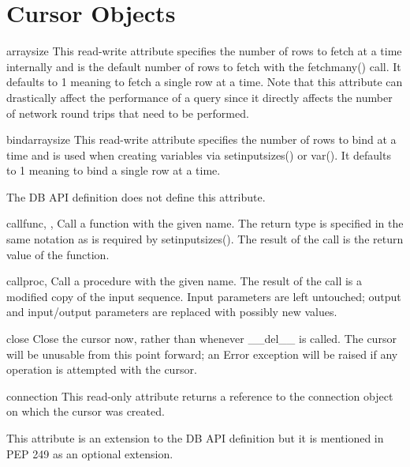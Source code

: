 \documentclass{manual}
\begin{document}
\chapter{Cursor Objects\label{cursorobj}}

\begin{datadesc}{arraysize}
  This read-write attribute specifies the number of rows to fetch at a time
  internally and is the default number of rows to fetch with the fetchmany()
  call. It defaults to 1 meaning to fetch a single row at a time. Note that
  this attribute can drastically affect the performance of a query since it
  directly affects the number of network round trips that need to be performed.
\end{datadesc}

\begin{datadesc}{bindarraysize}
  This read-write attribute specifies the number of rows to bind at a time and
  is used when creating variables via setinputsizes() or var(). It defaults to
  1 meaning to bind a single row at a time.

   The DB API definition does not define this attribute.
\end{datadesc}

\begin{funcdesc}{callfunc}{, , }
  Call a function with the given name. The return type is specified in the
  same notation as is required by setinputsizes(). The result of the call is
  the return value of the function.
\end{funcdesc}

\begin{funcdesc}{callproc}{, }
  Call a procedure with the given name. The result of the call is a modified
  copy of the input sequence. Input parameters are left untouched; output and
  input/output parameters are replaced with possibly new values.
\end{funcdesc}

\begin{funcdesc}{close}{}
  Close the cursor now, rather than whenever __del__ is called. The cursor will
  be unusable from this point forward; an Error exception will be raised if any
  operation is attempted with the cursor.
\end{funcdesc}

\begin{datadesc}{connection}
  This read-only attribute returns a reference to the connection object on
  which the cursor was created.

   This attribute is an extension to the DB API definition but it
  is mentioned in PEP 249 as an optional extension.
\end{datadesc}
\end{document}
